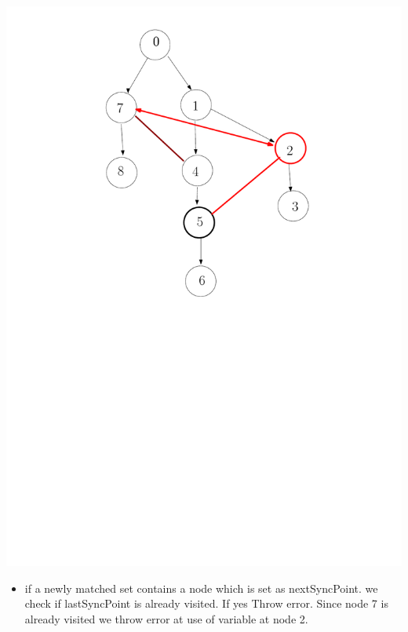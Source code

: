 \documentclass[12pt]{beamer}
\begin{document}
\begin{frame}[plain]
  \includegraphics[scale=0.3]{checksyncPoints2.pdf}
  \begin{itemize}
  \item if a newly matched set contains a node which is set as nextSyncPoint.
    we check if lastSyncPoint is already visited. If yes Throw error.
   Since node 7 is already visited we throw error at use of variable at node 2. 
  \end{itemize}
\end{frame}
\end{document}
